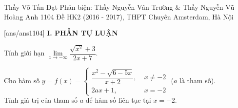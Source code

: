\begin{name}
{Thầy Võ Tấn Đạt \newline 
	Phản biện: Thầy Nguyễn Vân Trường \& Thầy Nguyễn Vũ Hoàng Anh}
{1104 Đề HK2 (2016 - 2017), THPT Chuyên Amsterdam, Hà Nội}
	\end{name}
	\setcounter{ex}{0}\setcounter{bt}{0}
	[ans/ans1104]
\noindent\textbf{I. PHẦN TỰ LUẬN}

\begin{bt}%

		 Tính giới hạn $\lim\limits_{x \rightarrow - \infty} \dfrac{\sqrt{x^2}+3}{2x+7}.$
		 

\end{bt}
\begin{bt}%
	Cho hàm số $y=f(x) = \begin{cases}
	\dfrac{	x^2-\sqrt{6-5x}}{x+2}, \; &x \ne -2 \\
	2ax+1, \; &x =-2
	\end{cases}$ ($a$ là tham số).\\
	Tính giá trị của tham số $a$ để hàm số liên tục tại $x=-2$.
\end{bt}
